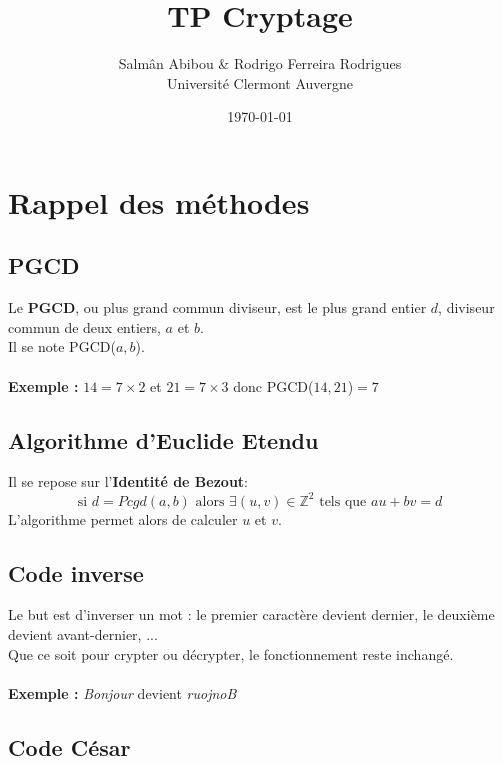 \documentclass[12pt,french,titlepage]{article}
\title{TP Cryptage}
\author{Salmân Abibou \& Rodrigo Ferreira Rodrigues \\
Université Clermont Auvergne\\}
\date{\today}
\begin{document}
	\maketitle


	\tableofcontents
	\newpage
	
	\section{Rappel des méthodes}
	
	\subsection{PGCD}
	
	Le \textbf{PGCD}, ou  plus grand commun diviseur, est le plus grand entier $d$, diviseur commun de deux entiers, $a$ et $b$.\\
	Il se note PGCD($a,b$).\\
	\\
	\textbf{Exemple : }$14 = 7\times2$ et $21 = 7\times3$ donc PGCD($14,21$)$ = 7$
	
	\subsection{Algorithme d'Euclide Etendu}
	
	Il se repose sur l'\textbf{Identité de Bezout}:\\
	\begin{equation}
	\text{si } d=Pcgd(a,b) \text{ alors } \exists (u,v)\in \mathbb{Z}^2 \text{ tels que }au+bv=d
	\end{equation}
	L'algorithme permet alors de calculer $u$ et $v$.
	\subsection{Code inverse}
	
	Le but est d'inverser un mot : le premier caractère devient dernier, le deuxième devient avant-dernier, ...\\
	Que ce soit pour crypter ou décrypter, le fonctionnement reste inchangé.\\
	\\
	\textbf{Exemple : }\textit{Bonjour} devient \textit{ruojnoB}
	
	\subsection{Code César}
	
\end{document}
